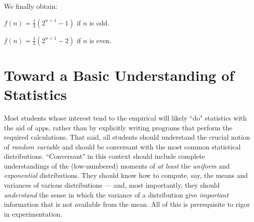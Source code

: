 %
%
%
%
%
%

We finally obtain: 

$f(n) = \frac{1}{3} (2^{n+1} -1)$ if $n$ is odd.

$f(n) = \frac{1}{3} (2^{n+1} -2)$ if $n$ is even.



\section{Toward a Basic Understanding of Statistics}

Most students whose interest tend to the empirical will likely ``do"
statistics with the aid of apps, rather than by explicitly writing
programs that perform the required calculations.  That said, all
students should understand the crucial notion of {\em random variable}
and should be conversant with the most common statistical
distributions.  ``Conversant" in this context should include complete
understandings of the (low-numbered) moments of {\em at least} the
{\em uniform} and {\em exponential} distributions.  They should know
how to compute, say, the means and variances of various distributions
— and, most importantly, they should {\em understand} the sense in
which the variance of a distribution give {\em important} information
that is not available from the mean.  All of this is prerequisite to
rigor in experimentation.

